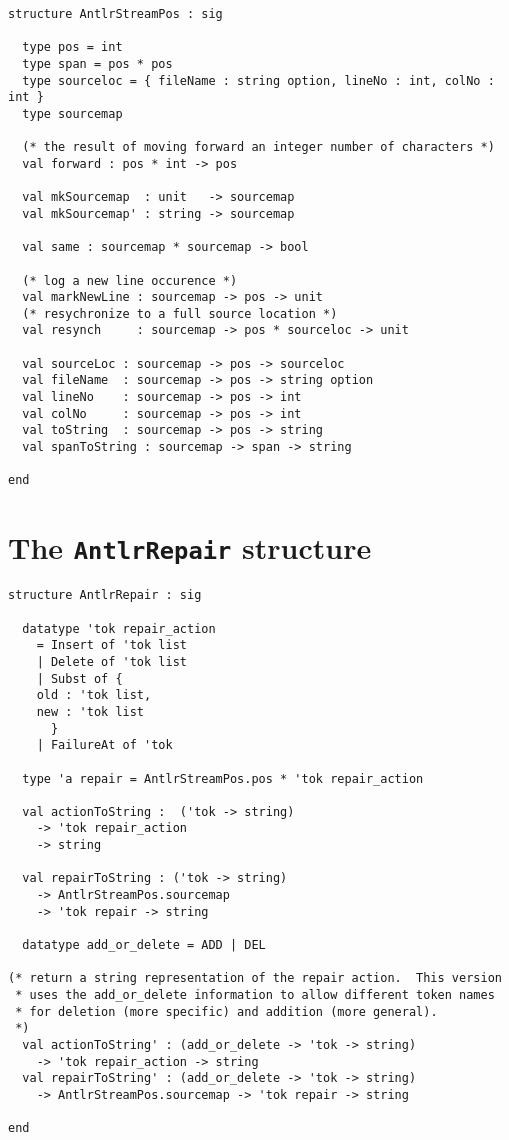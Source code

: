 \begin{lstlisting}
structure AntlrStreamPos : sig

  type pos = int
  type span = pos * pos
  type sourceloc = { fileName : string option, lineNo : int, colNo : int }
  type sourcemap

  (* the result of moving forward an integer number of characters *)
  val forward : pos * int -> pos

  val mkSourcemap  : unit   -> sourcemap
  val mkSourcemap' : string -> sourcemap

  val same : sourcemap * sourcemap -> bool

  (* log a new line occurence *)
  val markNewLine : sourcemap -> pos -> unit
  (* resychronize to a full source location *)
  val resynch     : sourcemap -> pos * sourceloc -> unit

  val sourceLoc : sourcemap -> pos -> sourceloc
  val fileName  : sourcemap -> pos -> string option
  val lineNo    : sourcemap -> pos -> int
  val colNo     : sourcemap -> pos -> int
  val toString  : sourcemap -> pos -> string
  val spanToString : sourcemap -> span -> string

end
\end{lstlisting}%


\section{The {\tt AntlrRepair} structure}

\begin{lstlisting}
structure AntlrRepair : sig

  datatype 'tok repair_action
    = Insert of 'tok list
    | Delete of 'tok list
    | Subst of {
	old : 'tok list,
	new : 'tok list
      }
    | FailureAt of 'tok

  type 'a repair = AntlrStreamPos.pos * 'tok repair_action

  val actionToString :  ('tok -> string)
	-> 'tok repair_action
	-> string

  val repairToString : ('tok -> string)
	-> AntlrStreamPos.sourcemap
	-> 'tok repair -> string

  datatype add_or_delete = ADD | DEL

(* return a string representation of the repair action.  This version
 * uses the add_or_delete information to allow different token names
 * for deletion (more specific) and addition (more general).
 *)
  val actionToString' : (add_or_delete -> 'tok -> string)
	-> 'tok repair_action -> string
  val repairToString' : (add_or_delete -> 'tok -> string)
	-> AntlrStreamPos.sourcemap -> 'tok repair -> string

end
\end{lstlisting}%

